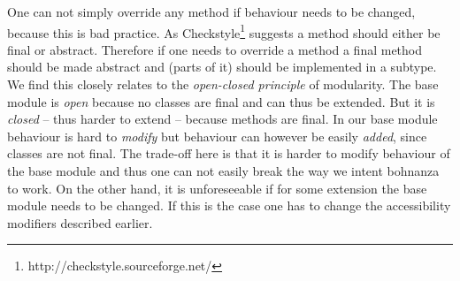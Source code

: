 One can not simply override any method if behaviour needs to be changed, because this is bad practice. As
Checkstyle\footnote{http://checkstyle.sourceforge.net/} suggests a method should either be final or abstract. Therefore if one needs to
override a method a final method should be made abstract and (parts of it) should be implemented in a subtype. We find this closely
relates to the \emph{open-closed principle} of modularity. The base module is \emph{open} because
no classes are final and can thus be extended. But it is \emph{closed} -- thus harder to extend --
because methods are final. In our base module behaviour is hard to \emph{modify} but behaviour can however
be easily \emph{added}, since classes are not final. The trade-off here is that it is harder to modify behaviour of the base module and thus
one can not easily break the way we intent bohnanza to work. On the other hand, it is unforeseeable if for some extension the base module
needs to be changed. If this is the case one has to change the accessibility modifiers described earlier.
